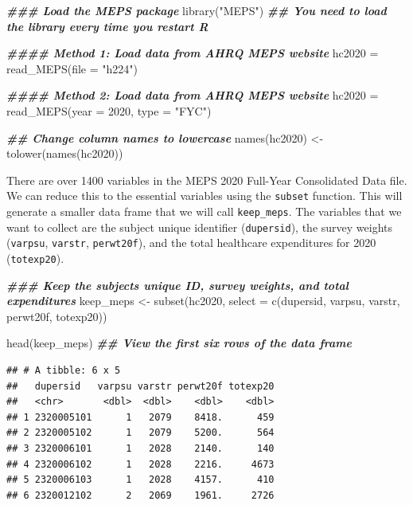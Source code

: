 \documentclass[
]{book}
\newenvironment{Shaded}{\begin{snugshade}}{\end{snugshade}}
\newcommand{\AttributeTok}[1]{\textcolor[rgb]{0.77,0.63,0.00}{#1}}
\newcommand{\DecValTok}[1]{\textcolor[rgb]{0.00,0.00,0.81}{#1}}
\newcommand{\DocumentationTok}[1]{\textcolor[rgb]{0.56,0.35,0.01}{\textbf{\textit{#1}}}}
\newcommand{\FunctionTok}[1]{\textcolor[rgb]{0.00,0.00,0.00}{#1}}
\newcommand{\NormalTok}[1]{#1}
\newcommand{\OtherTok}[1]{\textcolor[rgb]{0.56,0.35,0.01}{#1}}
\newcommand{\StringTok}[1]{\textcolor[rgb]{0.31,0.60,0.02}{#1}}
\begin{document}
\begin{Shaded}
\begin{Highlighting}[]
\DocumentationTok{\#\#\# Load the MEPS package}
\FunctionTok{library}\NormalTok{(}\StringTok{"MEPS"}\NormalTok{) }\DocumentationTok{\#\# You need to load the library every time you restart R}

\DocumentationTok{\#\#\#\# Method 1: Load data from AHRQ MEPS website}
\NormalTok{hc2020 }\OtherTok{=} \FunctionTok{read\_MEPS}\NormalTok{(}\AttributeTok{file =} \StringTok{"h224"}\NormalTok{)}

\DocumentationTok{\#\#\#\# Method 2: Load data from AHRQ MEPS website}
\NormalTok{hc2020 }\OtherTok{=} \FunctionTok{read\_MEPS}\NormalTok{(}\AttributeTok{year =} \DecValTok{2020}\NormalTok{, }\AttributeTok{type =} \StringTok{"FYC"}\NormalTok{)}

\DocumentationTok{\#\# Change column names to lowercase}
\FunctionTok{names}\NormalTok{(hc2020) }\OtherTok{\textless{}{-}} \FunctionTok{tolower}\NormalTok{(}\FunctionTok{names}\NormalTok{(hc2020))}
\end{Highlighting}
\end{Shaded}

There are over 1400 variables in the MEPS 2020 Full-Year Consolidated Data file. We can reduce this to the essential variables using the \texttt{subset} function. This will generate a smaller data frame that we will call \texttt{keep\_meps}. The variables that we want to collect are the subject unique identifier (\texttt{dupersid}), the survey weights (\texttt{varpsu}, \texttt{varstr}, \texttt{perwt20f}), and the total healthcare expenditures for 2020 (\texttt{totexp20}).

\begin{Shaded}
\begin{Highlighting}[]
\DocumentationTok{\#\#\# Keep the subject\textquotesingle{}s unique ID, survey weights, and total expenditures}
\NormalTok{keep\_meps }\OtherTok{\textless{}{-}} \FunctionTok{subset}\NormalTok{(hc2020, }\AttributeTok{select =} \FunctionTok{c}\NormalTok{(dupersid, varpsu, varstr, perwt20f, totexp20))}

\FunctionTok{head}\NormalTok{(keep\_meps) }\DocumentationTok{\#\# View the first six rows of the data frame}
\end{Highlighting}
\end{Shaded}

\begin{verbatim}
## # A tibble: 6 x 5
##   dupersid   varpsu varstr perwt20f totexp20
##   <chr>       <dbl>  <dbl>    <dbl>    <dbl>
## 1 2320005101      1   2079    8418.      459
## 2 2320005102      1   2079    5200.      564
## 3 2320006101      1   2028    2140.      140
## 4 2320006102      1   2028    2216.     4673
## 5 2320006103      1   2028    4157.      410
## 6 2320012102      2   2069    1961.     2726
\end{verbatim}
\end{document}
